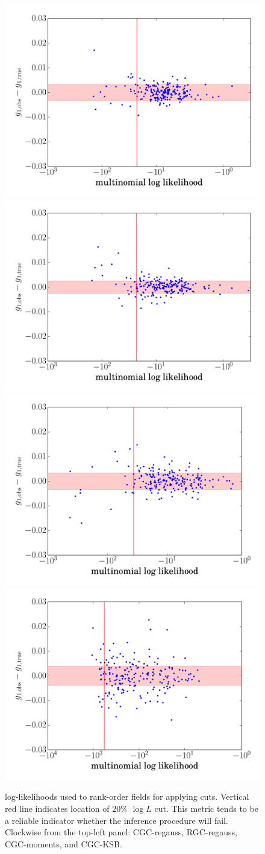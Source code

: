 \documentclass[iop]{emulateapj}
\begin{document}
\begin{figure}[t]
\begin{center}
\includegraphics[width=0.48\linewidth]{./Plots/logL1-regauss-opt-shear_plots.pdf}
\includegraphics[width=0.48\linewidth]{./Plots/logL1-rgc-regauss-opt-shear_plots.pdf}
\includegraphics[width=0.48\linewidth]{./Plots/logL1-ksb-opt-shear_plots.pdf}
\includegraphics[width=0.48\linewidth]{./Plots/logL1-moments-opt-shear_plots.pdf}
\end{center}
\caption{log-likelihoods used to rank-order fields for applying
  cuts. Vertical red line indicates location of $20\%$ $\log L$
  cut. This metric tends to be a reliable indicator whether
  the inference procedure will fail. Clockwise from the top-left
  panel: CGC-regauss, RGC-regauss, CGC-moments, and CGC-KSB.}
\end{figure}
\end{document}
